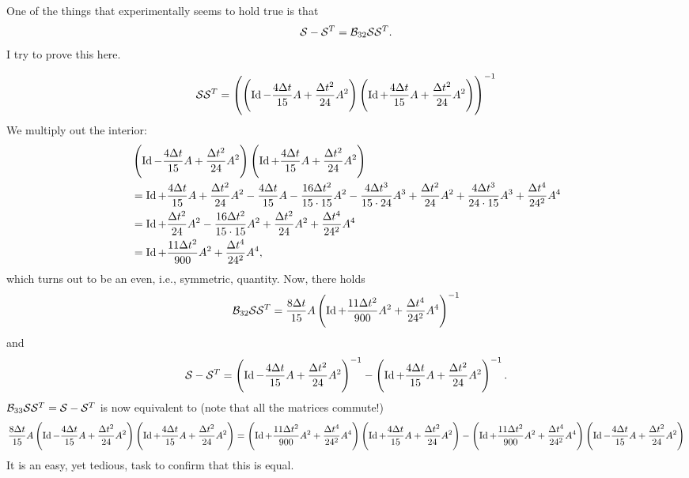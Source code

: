 \documentclass[]{scrartcl}
\numberwithin{equation}{section}
\begin{document}
\begin{landscape}
  One of the things that experimentally seems to hold true is that
  \begin{align*}
   \mathcal{S} - \mathcal{S}^T = \mathcal{B}_{32} \mathcal{S} \mathcal{S}^T.
  \end{align*}
  I try to prove this here. 

  \begin{align*}
   \mathcal{S} \mathcal{S}^T = \left(\left(\operatorname{Id} - \frac{4 \Delta t}{15} A + \frac{\Delta t^2}{24} A^2\right) \left(\operatorname{Id} + \frac{4 \Delta t}{15} A + \frac{\Delta t^2}{24} A^2\right)\right)^{-1}
  \end{align*}
We multiply out the interior:
\begin{align*}
 &\left(\operatorname{Id} - \frac{4 \Delta t}{15} A + \frac{\Delta t^2}{24} A^2\right) \left(\operatorname{Id} + \frac{4 \Delta t}{15} A + \frac{\Delta t^2}{24} A^2\right)
 \\ &= \operatorname{Id} + \frac{4 \Delta t}{15} A + \frac{\Delta t^2}{24} A^2
 -\frac{4\Delta t}{15} A - \frac{16 \Delta t^2}{15\cdot 15} A^2 - \frac{4\Delta t^3}{15\cdot 24} A^3
 + \frac{\Delta t^2}{24} A^2 +  \frac{4 \Delta t^3}{24\cdot 15} A^3 + \frac{\Delta t^4}{24^2} A^4 \\
 &= \operatorname{Id} + \frac{\Delta t^2}{24} A^2
 - \frac{16 \Delta t^2}{15\cdot 15} A^2
 + \frac{\Delta t^2}{24} A^2 +  \frac{\Delta t^4}{24^2} A^4 \\
 &= \operatorname{Id} + \frac{11\Delta t^2}{900} A^2 + \frac{\Delta t^4}{24^2} A^4,
\end{align*}
which turns out to be an even, i.e., symmetric, quantity.
Now, there holds
%
\begin{align*}
 \mathcal{B}_{32} \mathcal{S}\mathcal{S}^T = \frac{8 \Delta t}{15} A \left(\operatorname{Id} + \frac{11 \Delta t^2}{900} A^2 + \frac{\Delta t^4}{24^2} A^4\right)^{-1}
\end{align*}
%
and
\begin{align*}
 \mathcal{S} - \mathcal{S}^T = \left(\operatorname{Id} - \frac{4 \Delta t}{15} A + \frac{\Delta t^2}{24} A^2\right)^{-1}- \left(\operatorname{Id} + \frac{4 \Delta t}{15} A + \frac{\Delta t^2}{24} A^2\right)^{-1}.
\end{align*}
%
 $\mathcal{B}_{33} \mathcal{S} \mathcal{S}^T = \mathcal{S} - \mathcal{S}^T$ is now  equivalent to (note that all the matrices commute!)
\begin{align*}
\frac{8 \Delta t}{15} A \left(\operatorname{Id} - \frac{4 \Delta t}{15} A + \frac{\Delta t^2}{24} A^2\right)\left(\operatorname{Id} + \frac{4 \Delta t}{15} A + \frac{\Delta t^2}{24} A^2\right) =
\left(\operatorname{Id} + \frac{11 \Delta t^2}{900} A^2 + \frac{\Delta t^4}{24^2} A^4\right)\left(\operatorname{Id} + \frac{4 \Delta t}{15} A + \frac{\Delta t^2}{24} A^2\right) - \left(\operatorname{Id} + \frac{11 \Delta t^2}{900} A^2 + \frac{\Delta t^4}{24^2} A^4\right)\left(\operatorname{Id} - \frac{4 \Delta t}{15} A + \frac{\Delta t^2}{24} A^2\right)
\end{align*}
%
It is an easy, yet tedious, task to confirm that this is equal.


\end{landscape}



\newpage




%

\printbibliography
\end{document}

